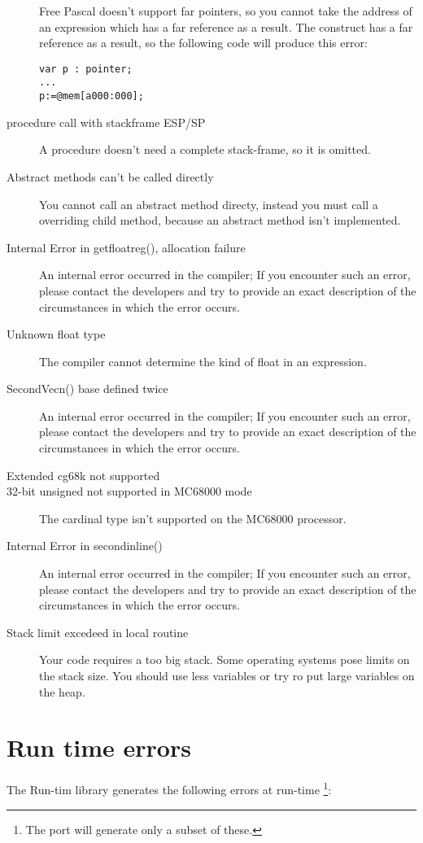\documentclass{report}
\begin{document}
\begin{description}
Free Pascal doesn't support far pointers, so you cannot take the address of
an expression which has a far reference as a result. The  construct
has a far reference as a result, so the following code will produce this
error:
\begin{verbatim}
var p : pointer;
...
p:=@mem[a000:000];
\end{verbatim}
\item [ procedure call with stackframe ESP/SP ]
A procedure doesn't need a complete stack-frame, so it is omitted.
\item [ Abstract methods can't be called directly ]
You cannot call an abstract method directy, instead you must call a
overriding child method, because an abstract method isn't implemented. 
\item [ Internal Error in getfloatreg(), allocation failure ]
An internal error occurred in the compiler; If you encounter such an error,
please contact the developers and try to provide  an exact description of
the circumstances in which the error occurs.
\item [ Unknown float type ]
The compiler cannot determine the kind of float in an expression.
\item [ SecondVecn() base defined twice ]
An internal error occurred in the compiler; If you encounter such an error,
please contact the developers and try to provide  an exact description of
the circumstances in which the error occurs.
\item [ Extended cg68k not supported ]
\item [ 32-bit unsigned not supported in MC68000 mode ]
The cardinal type isn't supported on the  MC68000 processor.
\item [ Internal Error in secondinline() ]
An internal error occurred in the compiler; If you encounter such an error,
please contact the developers and try to provide  an exact description of
the circumstances in which the error occurs.
\item [ Stack limit excedeed in local routine ]
Your code requires a too big stack. Some operating systems pose limits 
on the stack size. You should use less variables or try ro put large
variables on the heap. 
\end{description}

\chapter{Run time errors}
The \fpc Run-tim library generates the following errors at run-time
\footnote{The \linux port will generate only a subset of these.}:
\end{document}
